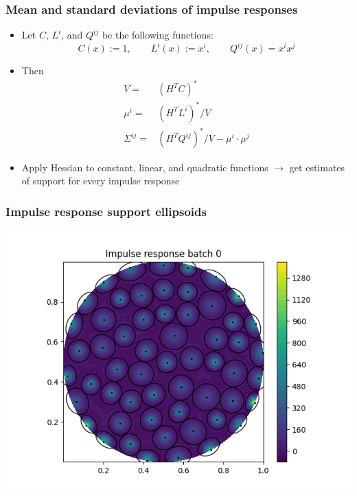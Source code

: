 \documentclass[10pt,final,xcolor=dvipsnames]{beamer}
\begin{document}
\begin{frame}
	\frametitle{Mean and standard deviations of impulse responses}
	\begin{itemize}
		\setlength\itemsep{2em}
		\item Let $C$, $L^i$, and $Q^{ij}$ be the following functions:
		\begin{equation*}
		C(x) := 1, \qquad
		L^i(x) := x^i, \qquad
		Q^{ij}(x) = x^i x^j
		\end{equation*}
		\item Then
		\begin{align*}
		V =& \left(H^T C\right)^* \\
		\mu^i =& \left(H^T L^i\right)^* / V \\
		\Sigma^{ij} =& \left(H^T Q^{ij}\right)^* / V - \mu^i\cdot \mu^j
		\end{align*}
		\item Apply Hessian to constant, linear, and quadratic functions $\rightarrow$ get estimates of support for every impulse response
	\end{itemize}
	
\end{frame}
\begin{frame}
	\frametitle{Impulse response support ellipsoids}
	\begin{center}
		\includegraphics[width=0.9\columnwidth]{IRB1.png} 
	\end{center}
\end{frame}
\end{document}
